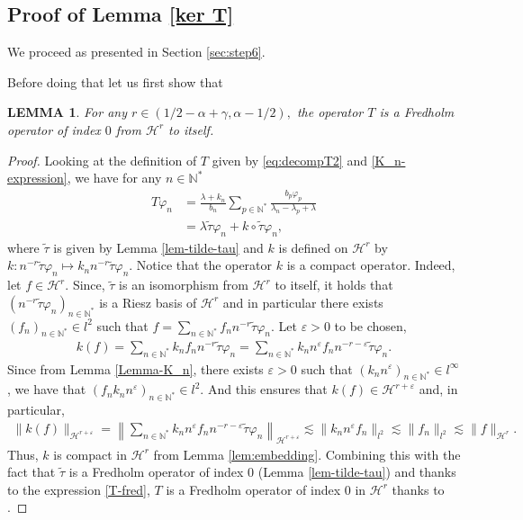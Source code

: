 \documentclass[11pt, dvipsnames]{amsart}
\newtheorem{lem}[theorem]{LEMMA}
\begin{document}
\subsection{Proof of Lemma \ref{ker T}}\label{sec-Appendix-kerT}
We proceed as presented in Section \ref{sec:step6}. 
{\color{black} Before doing that let us first show that 
\begin{lem}
\label{lem:Tfredholm}
    For any $r\in (1/2-\alpha+\gamma, \alpha-1/2),$ the operator $T$ is a Fredholm operator of index $0$ from $\mathcal{H}^{r}$ to itself. 
\end{lem} 
\begin{proof}
   Looking at the definition of $T$ given by \eqref{eq:decompT2} and \eqref{K_n-expression}, we have for any $n\in\mathbb{N}^*$
 \begin{align}
 T\varphi_{n} &= \frac{\lambda+k_{n}}{b_{n}}\sum\limits_{p\in\mathbb{N}^{*}}\frac{b_p \varphi_{p}}{\lambda_{n}-\lambda_{p}+\lambda}\nonumber\\
 &= \lambda\tilde \tau \varphi_{n}+k\circ\tilde\tau \varphi_n,\label{T-fred}
 \end{align}
 where $\tilde\tau$ is given by Lemma \ref{lem-tilde-tau} and $k$ is defined on $\mathcal{H}^r$ by $k:n^{-r}\tilde \tau \varphi_n\mapsto k_n n^{-r}\tilde \tau \varphi_n$. Notice that the operator $k$ is a compact operator. Indeed, let $f\in \mathcal{H}^r.$ Since, $\tilde \tau$ is an isomorphism from $\mathcal{H}^r$ to itself, it holds that $(n^{-r}\tilde \tau \varphi_n)_{n\in \mathbb{N}^*}$ is a Riesz basis of $\mathcal{H}^r$ and in particular there exists $(f_n)_{n\in \mathbb{N}^*}\in l^2$ such that $f=\displaystyle\sum_{n\in \mathbb{N}^*}f_n n^{-r}\tilde \tau \varphi_n.$ Let $\varepsilon>0$ to be chosen, 
 \begin{align*}
     k(f)=\sum_{n\in \mathbb{N}^*}k_n f_n n^{-r}\tilde \tau \varphi_n=\sum_{n\in \mathbb{N}^*}k_n n^{\varepsilon} f_n n^{-r-\varepsilon}\tilde \tau \varphi_n.
 \end{align*}
 Since from Lemma \ref{Lemma-K_n}, there exists $\varepsilon>0$ such that $(k_n n^{\varepsilon})_{n\in \mathbb{N}^*}\in l^{\infty}$ , we have that $(f_n k_n n^{\varepsilon})_{n\in \mathbb{N}^*}\in l^{2}.$ And this ensures that $k(f)\in \mathcal{H}^{r+\varepsilon}$ and, in particular, 
 \begin{align*}
     \|k(f)\|_{\mathcal{H}^{r+\varepsilon}}=\left\|\sum_{n\in \mathbb{N}^*}k_n n^{\varepsilon} f_n n^{-r-\varepsilon}\tilde \tau \varphi_n\right\|_{\mathcal{H}^{r+\varepsilon}}\lesssim \|k_n n^{\varepsilon} f_n\|_{l^2}\lesssim \|f_n\|_{l^2}\lesssim\|f\|_{\mathcal{H}^{r}}.
 \end{align*}
 Thus, $k$ is compact in $\mathcal{H}^r$ from Lemma \ref{lem:embedding}. Combining this with the fact that $\tilde \tau$ is a Fredholm operator of index $0$ (Lemma \ref{lem-tilde-tau}) and thanks to the expression \eqref{T-fred}, $T$ is a Fredholm operator of index $0$ in $\mathcal{H}^r$ thanks to  \cite[p. 169]{Brezis2011-functional}. 
\end{proof}
}
\end{document}
